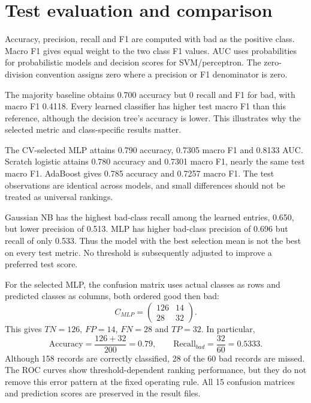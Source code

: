 \section{Test evaluation and comparison}
Accuracy, precision, recall and F1 are computed with bad as the positive class. Macro F1 gives equal weight to the two class F1 values. AUC uses probabilities for probabilistic models and decision scores for SVM/perceptron. The zero-division convention assigns zero where a precision or F1 denominator is zero.


The majority baseline obtains 0.700 accuracy but 0 recall and F1 for bad, with macro F1 0.4118. Every learned classifier has higher test macro F1 than this reference, although the decision tree's accuracy is lower. This illustrates why the selected metric and class-specific results matter.

The CV-selected MLP attains 0.790 accuracy, 0.7305 macro F1 and 0.8133 AUC. Scratch logistic attains 0.780 accuracy and 0.7301 macro F1, nearly the same test macro F1. AdaBoost gives 0.785 accuracy and 0.7257 macro F1. The test observations are identical across models, and small differences should not be treated as universal rankings.

Gaussian NB has the highest bad-class recall among the learned entries, 0.650, but lower precision of 0.513. MLP has higher bad-class precision of 0.696 but recall of only 0.533. Thus the model with the best selection mean is not the best on every test metric. No threshold is subsequently adjusted to improve a preferred test score.

For the selected MLP, the confusion matrix uses actual classes as rows and predicted classes as columns, both ordered good then bad:
\[
C_{MLP}=\begin{pmatrix}126&14\\28&32\end{pmatrix}.
\]
This gives $TN=126$, $FP=14$, $FN=28$ and $TP=32$. In particular,
\[
\mathrm{Accuracy}=\frac{126+32}{200}=0.79,\qquad
\mathrm{Recall}_{bad}=\frac{32}{60}=0.5333.
\]
Although 158 records are correctly classified, 28 of the 60 bad records are missed. The ROC curves show threshold-dependent ranking performance, but they do not remove this error pattern at the fixed operating rule. All 15 confusion matrices and prediction scores are preserved in the result files.

